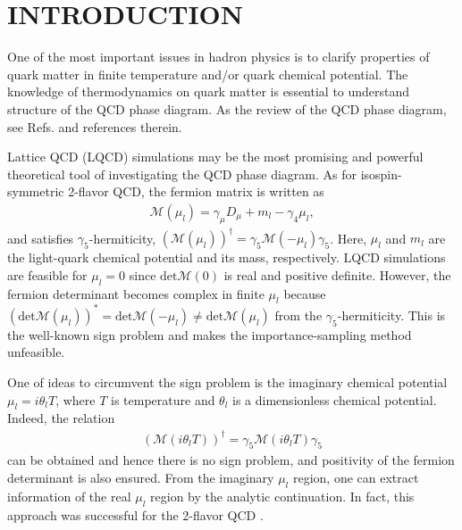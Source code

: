 \documentclass[prd,superscriptaddress,unsortedaddress,
twocolumn,showpacs,preprintnumbers,amsmath,amssymb]{revtex4}
\begin{document}
 
\maketitle

\section{INTRODUCTION}
One of the most important issues in hadron physics is to clarify
properties of quark matter in finite
temperature and/or quark chemical potential.
The knowledge of thermodynamics
on quark matter is essential to understand
structure of the QCD phase diagram.
As the review of the QCD phase diagram,
see Refs.
\cite{Stephanov, Munzinger-Wambach, Fukushima-Hatsuda, Fukushima-Sasaki}
and references therein.

Lattice QCD (LQCD) simulations may be the most
promising and powerful theoretical tool of investigating
the QCD phase diagram.
As for isospin-symmetric 2-flavor QCD, the fermion matrix
is written as
\begin{eqnarray}
 \mathcal{M}(\mu_{l}) = \gamma_{\mu}D_{\mu}+m_{l}-\gamma_{4}\mu_{l},
  \label{2-flavor_determinant}
\end{eqnarray}
and satisfies $\gamma_{5}$-hermiticity,
 $(\mathcal{M}(\mu_{l}))^{\dag}=\gamma_{5}\mathcal{M}(-\mu_{l})\gamma_{5}$.
Here, $\mu_{l}$ and $m_{l}$ are the light-quark chemical potential and
its mass, respectively.
LQCD simulations are feasible for $\mu_{l}=0$
since $\textrm{det}\mathcal{M}(0)$
is real and positive definite.
However,
the fermion determinant becomes complex
in finite $\mu_{l}$ because
 $\left(\textrm{det}\mathcal{M}(\mu_{l})\right)^{\ast}=\textrm{det}
  \mathcal{M}(-\mu_{l})\ne \textrm{det}\mathcal{M}(\mu_{l})$
  from the $\gamma_{5}$-hermiticity.
This is the well-known sign problem and
makes the importance-sampling method unfeasible.

One of ideas to circumvent the sign problem
is the imaginary chemical potential $\mu_{l}=i\theta_{l}T$,
where $T$ is temperature and $\theta_{l}$ is a
dimensionless chemical potential.
Indeed, the relation
\begin{eqnarray}
(\mathcal{M}(i\theta_{l}T))^{\dag}
=\gamma_{5} \mathcal{M}(i\theta_{l}T)\gamma_{5}
\end{eqnarray}
can be obtained
and hence there is no sign problem,
and positivity of the fermion determinant is also ensured.
From the imaginary $\mu_{l}$ region,
one can extract information of the real $\mu_{l}$ region
by the analytic continuation.
In fact, this approach was successful for the 2-flavor QCD
\cite{Forcrand-Philipsen1, DElia-Lombard,
Wu-Luo-Chen,DElia-Sanfilippo, Forcrand-Philipsen2,
Nagata-Nakamura, Cea_two_flavor, Takahashi1, Bonati_chiral_transition, Takahashi2}.
\end{document}
